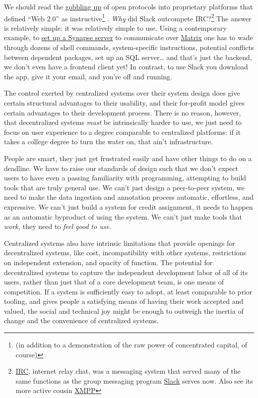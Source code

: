 We should read the
\href{https://en.wikipedia.org/wiki/Embrace,_extend,_and_extinguish}{gobbling
up} of open protocols into proprietary platforms that defined ``Web
2.0'' as instructive\footnote{(in addition to a demonstration of the raw
  power of concentrated capital, of course)}\citep{markoffTomorrowWorldWide1996} . \emph{Why} did Slack outcompete
IRC?\footnote{\href{https://en.wikipedia.org/wiki/Internet_Relay_Chat}{IRC},
  internet relay chat, was a messaging system that served many of the
  same functions as the group messaging program
  \href{https://slack.com/}{Slack} serves now. Also see its more active
  cousin \href{https://en.wikipedia.org/wiki/XMPP}{XMPP}} The answer is
relatively simple: it was relatively simple to use. Using a contemporary
example, to
\href{https://matrix-org.github.io/synapse/latest/setup/installation.html}{set
up a Synapse server} to communicate over
\href{https://matrix.org/docs/spec/}{Matrix} one has to wade through
dozens of shell commands, system-specific instructions, potential
conflicts between dependent packages, set up an SQL server\ldots{} and
that's just the backend, we don't even have a frontend client yet! In
contrast, to use Slack you download the app, give it your email, and
you're off and running.

The control exerted by centralized systems over their system design does
give certain structural advantages to their usability, and their
for-profit model gives certain advantages to their development process.
There is no reason, however, that decentralized systems \emph{must} be
intrinsically harder to use, we just need to focus on user experience to
a degree comparable to centralized platforms: if it takes a college
degree to turn the water on, that ain't infrastructure.

People are smart, they just get frustrated easily and have other things
to do on a deadline. We have to raise our standards of design such that
we don't expect users to have even a passing familiarity with
programming, attempting to build tools that are truly general use. We
can't just design a peer-to-peer system, we need to make the data
ingestion and annotation process automatic, effortless, and expressive.
We can't just build a system for credit assignment, it needs to happen
as an automatic byproduct of using the system. We can't just make tools
that \emph{work,} they need to \emph{feel good to use.}

Centralized systems also have intrinsic limitations that provide
openings for decentralized systems, like cost, incompatibility with
other systems, restrictions on independent extension, and opacity of
function. The potential for decentralized systems to capture the
independent development labor of all of its users, rather than just that
of a core development team, is one means of competition. If a system is
sufficiently easy to adopt, at least comparable to prior tooling, and
gives people a satisfying means of having their work accepted and
valued, the social and technical joy might be enough to outweigh the
inertia of change and the convenience of centralized systems.

